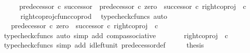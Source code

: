 \begin{isabellebody}
%
\isadelimproof
%
\endisadelimproof
%
\isatagproof
{}\isamarkupfalse%
\ {\isacharminus}{\kern0pt}\isanewline
\ \ \isamarkupfalse%
\ {\isachardoublequoteopen}predecessor{\isacharprime}{\kern0pt}\ {\isasymcirc}\isactrlsub c\ successor\ {\isacharequal}{\kern0pt}\ predecessor{\isacharprime}{\kern0pt}\ {\isasymcirc}\isactrlsub c\ {\isacharparenleft}{\kern0pt}zero\ {\isasymamalg}\ successor{\isacharparenright}{\kern0pt}\ {\isasymcirc}\isactrlsub c\ right{\isacharunderscore}{\kern0pt}coproj\ {\isasymone}\ {\isasymnat}\isactrlsub c{\isachardoublequoteclose}\isanewline
\ \ \ \ \isamarkupfalse%
\ right{\isacharunderscore}{\kern0pt}coproj{\isacharunderscore}{\kern0pt}cfunc{\isacharunderscore}{\kern0pt}coprod\ \isamarkupfalse%
\ {\isacharparenleft}{\kern0pt}typecheck{\isacharunderscore}{\kern0pt}cfuncs{\isacharcomma}{\kern0pt}\ auto{\isacharparenright}{\kern0pt}\isanewline
\ \ \isamarkupfalse%
\ \isamarkupfalse%
\ {\isachardoublequoteopen}{\isachardot}{\kern0pt}{\isachardot}{\kern0pt}{\isachardot}{\kern0pt}\ {\isacharequal}{\kern0pt}\ {\isacharparenleft}{\kern0pt}predecessor{\isacharprime}{\kern0pt}\ {\isasymcirc}\isactrlsub c\ {\isacharparenleft}{\kern0pt}zero\ {\isasymamalg}\ successor{\isacharparenright}{\kern0pt}{\isacharparenright}{\kern0pt}\ {\isasymcirc}\isactrlsub c\ right{\isacharunderscore}{\kern0pt}coproj\ {\isasymone}\ {\isasymnat}\isactrlsub c{\isachardoublequoteclose}\isanewline
\ \ \ \ \isamarkupfalse%
\ {\isacharparenleft}{\kern0pt}typecheck{\isacharunderscore}{\kern0pt}cfuncs{\isacharcomma}{\kern0pt}\ auto\ simp\ add{\isacharcolon}{\kern0pt}\ comp{\isacharunderscore}{\kern0pt}associative{}{\isacharparenright}{\kern0pt}\isanewline
\ \ \isamarkupfalse%
\ \isamarkupfalse%
\ {\isachardoublequoteopen}{\isachardot}{\kern0pt}{\isachardot}{\kern0pt}{\isachardot}{\kern0pt}\ {\isacharequal}{\kern0pt}\ right{\isacharunderscore}{\kern0pt}coproj\ {\isasymone}\ {\isasymnat}\isactrlsub c{\isachardoublequoteclose}\isanewline
\ \ \ \ \isamarkupfalse%
\ {\isacharparenleft}{\kern0pt}typecheck{\isacharunderscore}{\kern0pt}cfuncs{\isacharcomma}{\kern0pt}\ simp\ add{\isacharcolon}{\kern0pt}\ id{\isacharunderscore}{\kern0pt}left{\isacharunderscore}{\kern0pt}unit{}\ predecessor{\isacharprime}{\kern0pt}{\isacharunderscore}{\kern0pt}def{}{\isacharparenright}{\kern0pt}\isanewline
\ \ \isamarkupfalse%
\ \isamarkupfalse%
\ {\isacharquery}{\kern0pt}thesis\isanewline

\end{isabellebody}
